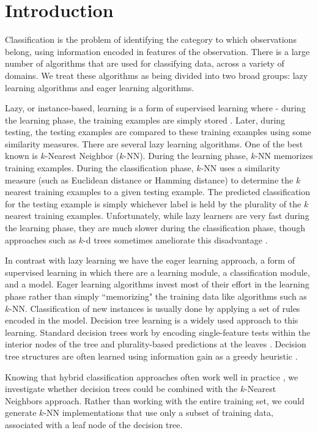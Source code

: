 \section{Introduction}
Classification is the problem of identifying the category to which observations belong, using information encoded in features of the observation. There is a large number of algorithms that are used for classifying data, across a variety of domains.  We treat these algorithms as being divided into two broad groups: lazy learning algorithms and eager learning algorithms.

Lazy, or instance-based, learning is a form of supervised learning where - during the learning phase, the training examples are simply stored \cite{FathiMazinani}.  Later, during testing, the testing examples are compared to these training examples using some similarity measures.  There are several lazy learning algorithms. One of the best known is $k$-Nearest Neighbor ($k$-NN). During the learning phase, $k$-NN memorizes training examples. During the classification phase, $k$-NN uses a similarity measure (such as Euclidean distance or Hamming distance) to determine the $k$ nearest training examples to a given testing example.  The predicted classification for the testing example is simply whichever label is held by the plurality of the $k$ nearest training examples.  Unfortunately, while lazy learners are very fast during the learning phase, they are much slower during the classification phase, though approaches such as $k$-d trees sometimes ameliorate this disadvantage \cite{Wettschereck}\cite{Sun}.

In contrast with lazy learning we have the eager learning approach, a form of supervised learning in which there are a learning module, a classification module, and a model. Eager learning algorithms invest most of their effort in the learning phase rather than simply ``memorizing" the training data like algorithms such as $k$-NN. Classification of new instances is usually done by applying a set of rules encoded in the model. Decision tree learning is a widely used approach to this learning. Standard decision trees work by encoding single-feature tests within the interior nodes of the tree and plurality-based predictions at the leaves \cite{FathiMazinani}.  Decision tree structures are often learned using information gain as a greedy heuristic \cite{Kotsiantis}.

Knowing that hybrid classification approaches often work well in practice \cite{Friedl}, we investigate whether decision trees could be combined with the $k$-Nearest Neighbors approach.  Rather than working with the entire training set, we could generate $k$-NN implementations that use only a subset of training data, associated with a leaf node of the decision tree.

